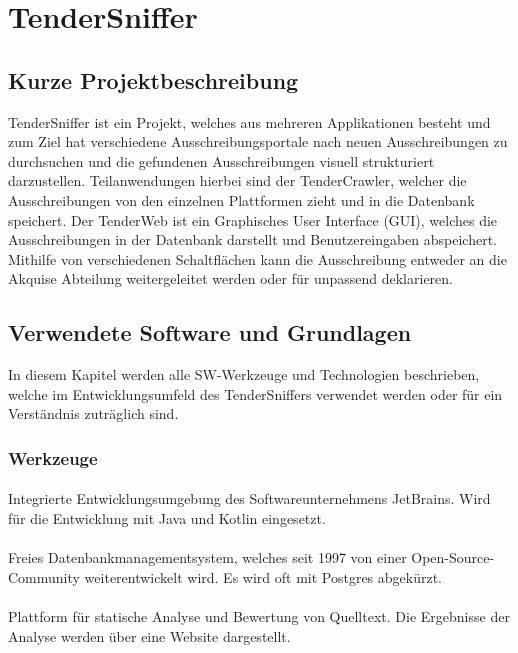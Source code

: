 \chapter{TenderSniffer}

\section{Kurze Projektbeschreibung}
TenderSniffer ist ein Projekt, welches aus mehreren Applikationen besteht und zum Ziel hat verschiedene
Ausschreibungsportale nach neuen Ausschreibungen zu durchsuchen und die gefundenen Ausschreibungen visuell strukturiert
darzustellen. Teilanwendungen hierbei sind der TenderCrawler, welcher die Ausschreibungen von den einzelnen Plattformen
zieht und in die Datenbank speichert. Der TenderWeb ist ein Graphisches User Interface (GUI), welches die
Ausschreibungen in der Datenbank darstellt und Benutzereingaben abspeichert. Mithilfe von verschiedenen Schaltflächen
kann die Ausschreibung entweder an die Akquise Abteilung weitergeleitet werden oder für unpassend deklarieren.

\section{Verwendete Software und Grundlagen}
In diesem Kapitel werden alle SW-Werkzeuge und Technologien beschrieben, welche im Entwicklungsumfeld des TenderSniffers
verwendet werden oder für ein Verständnis zuträglich sind.

\subsection{Werkzeuge}

\subsubsection{\textcite{intellij-idea}}
Integrierte Entwicklungsumgebung des Softwareunternehmens JetBrains. Wird für die Entwicklung mit Java und Kotlin
eingesetzt. 

\subsubsection{\textcite{postgresql}}
Freies Datenbankmanagementsystem, welches seit 1997 von einer Open-Source-Community weiterentwickelt wird. Es wird oft
mit Postgres abgekürzt.

\subsubsection{\textcite{sonarqube}}
Plattform für statische Analyse und Bewertung von Quelltext. Die Ergebnisse der Analyse werden über eine Website dargestellt.

